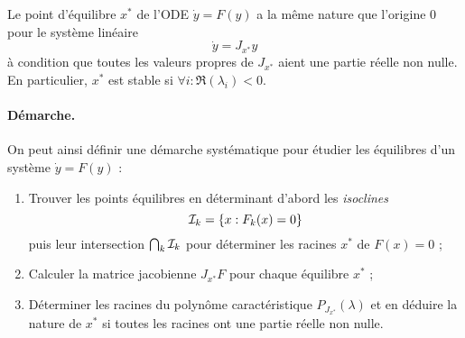 \begin{theorem}
  Le point d'équilibre $x^*$ de l'ODE $\dot y = F(y)$ a la même nature que l'origine $0$ pour le système linéaire 
  $$
  \dot y = J_{x^*} y
  $$
  à condition que toutes les valeurs propres de $J_{x^*}$ aient une partie réelle non nulle. \\
  En particulier, $x^*$ est stable si $\forall i: \Re(\lambda_i) < 0$.
\end{theorem}

\paragraph*{Démarche.}
On peut ainsi définir une démarche systématique pour étudier les équilibres d'un système $\dot y = F(y)$ :
\begin{enumerate}
  \item Trouver les points équilibres en déterminant d'abord les {\em isoclines}
  $$
  \mathcal{I}_k = \{x : F_k(x) = 0\}
  $$
  puis leur intersection $\bigcap_k \mathcal{I}_k$ pour déterminer les racines $x^*$ de  $F(x) = 0$ ;
  \item Calculer la matrice jacobienne $J_{x^*} F$ pour chaque équilibre $x^*$ ;
  \item Déterminer les racines du polynôme caractéristique $P_{J_{x^*}}(\lambda)$ et en déduire la nature de $x^*$ si toutes les racines ont une partie réelle non nulle.
\end{enumerate}

